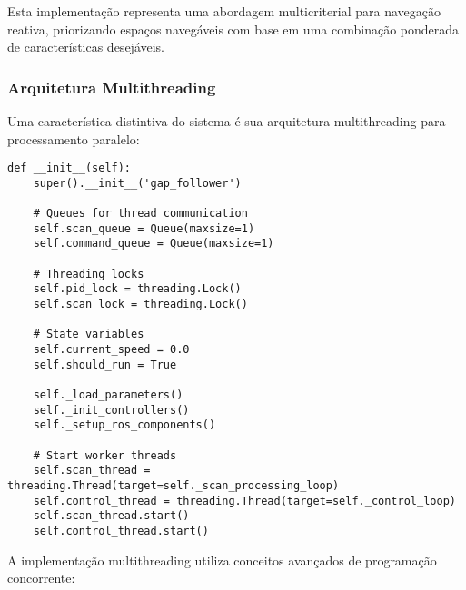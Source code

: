 Esta implementação representa uma abordagem multicriterial para navegação
reativa, priorizando espaços navegáveis com base em uma combinação ponderada de
características desejáveis.

\subsubsection{Arquitetura Multithreading}

Uma característica distintiva do sistema é sua arquitetura multithreading para
processamento paralelo:

\begin{verbatim}
def __init__(self):
    super().__init__('gap_follower')
    
    # Queues for thread communication
    self.scan_queue = Queue(maxsize=1)
    self.command_queue = Queue(maxsize=1)
    
    # Threading locks
    self.pid_lock = threading.Lock()
    self.scan_lock = threading.Lock()
    
    # State variables
    self.current_speed = 0.0
    self.should_run = True
    
    self._load_parameters()
    self._init_controllers()
    self._setup_ros_components()
    
    # Start worker threads
    self.scan_thread = threading.Thread(target=self._scan_processing_loop)
    self.control_thread = threading.Thread(target=self._control_loop)
    self.scan_thread.start()
    self.control_thread.start()
\end{verbatim}

A implementação multithreading utiliza conceitos avançados de programação
concorrente:


